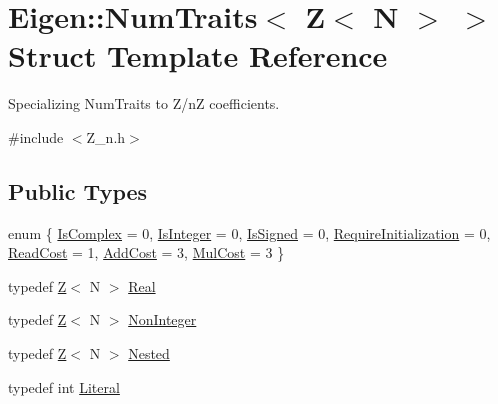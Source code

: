 \hypertarget{structEigen_1_1NumTraits_3_01Z_3_01N_01_4_01_4}{}\section{Eigen\+:\+:Num\+Traits$<$ Z$<$ N $>$ $>$ Struct Template Reference}
\label{structEigen_1_1NumTraits_3_01Z_3_01N_01_4_01_4}


Specializing Num\+Traits to Z/nZ coefficients.  




{\ttfamily \#include $<$Z\+\_\+n.\+h$>$}

\subsection*{Public Types}
\begin{DoxyCompactItemize}
\item 
enum \{ \newline
\hyperlink{structEigen_1_1NumTraits_3_01Z_3_01N_01_4_01_4_a1d8939bd585b60ec61e806fc7746335ea6c8eb445b3a7229e39f17d7ecfb436c1}{Is\+Complex} = 0, 
\hyperlink{structEigen_1_1NumTraits_3_01Z_3_01N_01_4_01_4_a1d8939bd585b60ec61e806fc7746335eafe6aa532bc302c25acc075710bdae324}{Is\+Integer} = 0, 
\hyperlink{structEigen_1_1NumTraits_3_01Z_3_01N_01_4_01_4_a1d8939bd585b60ec61e806fc7746335ea3fd4b1528c990c1fb32745a57e5034d6}{Is\+Signed} = 0, 
\hyperlink{structEigen_1_1NumTraits_3_01Z_3_01N_01_4_01_4_a1d8939bd585b60ec61e806fc7746335ead6dcd36369e8ba30de5940b21c1eeebd}{Require\+Initialization} = 0, 
\newline
\hyperlink{structEigen_1_1NumTraits_3_01Z_3_01N_01_4_01_4_a1d8939bd585b60ec61e806fc7746335eacbe8b935f47659896bbfe63e5575620e}{Read\+Cost} = 1, 
\hyperlink{structEigen_1_1NumTraits_3_01Z_3_01N_01_4_01_4_a1d8939bd585b60ec61e806fc7746335ea24b9a1fdb58e87d846d5fd17ca7b2573}{Add\+Cost} = 3, 
\hyperlink{structEigen_1_1NumTraits_3_01Z_3_01N_01_4_01_4_a1d8939bd585b60ec61e806fc7746335eadca4b4458ad099a4cf655c4f8c430f6e}{Mul\+Cost} = 3
 \}
\item 
typedef \hyperlink{classZ}{Z}$<$ N $>$ \hyperlink{structEigen_1_1NumTraits_3_01Z_3_01N_01_4_01_4_a44847690171e3535ea893e5d3742d5dc}{Real}
\item 
typedef \hyperlink{classZ}{Z}$<$ N $>$ \hyperlink{structEigen_1_1NumTraits_3_01Z_3_01N_01_4_01_4_a54a7b88f9d282c613909ac128476d3d1}{Non\+Integer}
\item 
typedef \hyperlink{classZ}{Z}$<$ N $>$ \hyperlink{structEigen_1_1NumTraits_3_01Z_3_01N_01_4_01_4_aadda945d9b822d2c43cddd141d895ab5}{Nested}
\item 
typedef int \hyperlink{structEigen_1_1NumTraits_3_01Z_3_01N_01_4_01_4_afc07a3fc65ced03bfc30de81355ac988}{Literal}
\end{DoxyCompactItemize}
